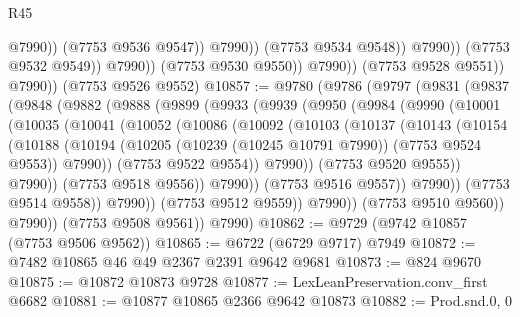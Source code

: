 \begin{lexlean}{R45}
\begin{coremodule}
{                                      @7990))
                                  (@7753 @9536 @9547))
                                @7990))
                            (@7753 @9534 @9548))
                          @7990))
                      (@7753 @9532 @9549))
                    @7990))
                (@7753 @9530 @9550))
              @7990))
          (@7753 @9528 @9551))
        @7990))
    (@7753 @9526 @9552)
@10857 := @9780
    (@9786
      (@9797
        (@9831
          (@9837
            (@9848
              (@9882
                (@9888
                  (@9899
                    (@9933
                      (@9939
                        (@9950
                          (@9984
                            (@9990
                              (@10001
                                (@10035
                                  (@10041
                                    (@10052
                                      (@10086
                                        (@10092
                                          (@10103
                                            (@10137
                                              (@10143
                                                (@10154
                                                  (@10188
                                                    (@10194
                                                      (@10205
                                                        (@10239 (@10245 @10791 @7990))
                                                        (@7753 @9524 @9553))
                                                      @7990))
                                                  (@7753 @9522 @9554))
                                                @7990))
                                            (@7753 @9520 @9555))
                                          @7990))
                                      (@7753 @9518 @9556))
                                    @7990))
                                (@7753 @9516 @9557))
                              @7990))
                          (@7753 @9514 @9558))
                        @7990))
                    (@7753 @9512 @9559))
                  @7990))
              (@7753 @9510 @9560))
            @7990))
        (@7753 @9508 @9561))
      @7990)
@10862 := @9729 (@9742 @10857 (@7753 @9506 @9562))
@10865 := @6722 (@6729 @9717) @7949
@10872 := @7482 @10865 @46 @49 @2367 @2391 @9642 @9681
@10873 := @824 @9670
@10875 := @10872 @10873 @9728
@10877 := LexLeanPreservation.conv_first @6682
@10881 := @10877 @10865 @2366 @9642 @10873
@10882 := Prod.snd.{0, 0}
}
\end{coremodule}
\end{lexlean}
